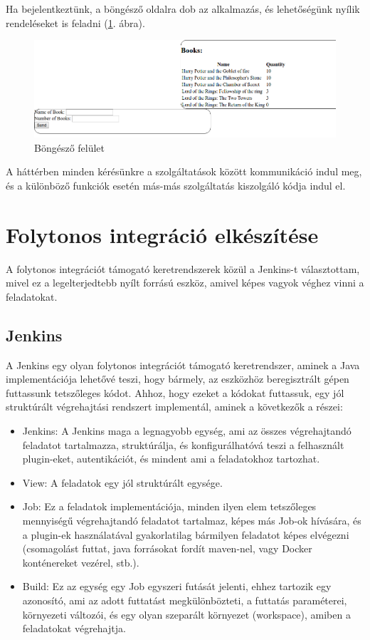 \documentclass[11pt,magyar,a4paper,twoside,]{report}
\providecommand{\tightlist}{%
  \setlength{\itemsep}{0pt}\setlength{\parskip}{0pt}}
\let\Oldincludegraphics\includegraphics
\renewcommand{\includegraphics}[1]{
\begin{adjustbox}{max size={\textwidth}{\textheight}}
    \Oldincludegraphics[scale=0.6]{#1}%
\end{adjustbox}
}
\begin{document}
Ha bejelentkeztünk, a böngésző oldalra dob az alkalmazás, és
lehetőségünk nyílik rendeléseket is feladni (\ref{browse}. ábra).

\begin{figure}[H]
\centering
\includegraphics{img/browsescreen.png}
\caption{Böngésző felület\label{browse}}
\end{figure}

A háttérben minden kérésünkre a szolgáltatások között kommunikáció indul
meg, és a különböző funkciók esetén más-más szolgáltatás kiszolgáló
kódja indul el.

\section{Folytonos integráció
elkészítése}\label{folytonos-integruxe1ciuxf3-elkuxe9szuxedtuxe9se}

A folytonos integrációt támogató keretrendszerek közül a Jenkins-t
választottam, mivel ez a legelterjedtebb nyílt forrású eszköz, amivel
képes vagyok véghez vinni a feladatokat.

\subsection{Jenkins}\label{jenkins}

A Jenkins egy olyan folytonos integrációt támogató keretrendszer, aminek
a Java implementációja lehetővé teszi, hogy bármely, az eszközhöz
beregisztrált gépen futtassunk tetszőleges kódot. Ahhoz, hogy ezeket a
kódokat futtassuk, egy jól struktúrált végrehajtási rendszert
implementál, aminek a következők a részei:

\begin{itemize}
\tightlist
\item
  Jenkins: A Jenkins maga a legnagyobb egység, ami az összes
  végrehajtandó feladatot tartalmazza, struktúrálja, és konfigurálhatóvá
  teszi a felhasznált plugin-eket, autentikációt, és mindent ami a
  feladatokhoz tartozhat.
\item
  View: A feladatok egy jól struktúrált egysége.
\item
  Job: Ez a feladatok implementációja, minden ilyen elem tetszőleges
  mennyiségű végrehajtandó feladatot tartalmaz, képes más Job-ok
  hívására, és a plugin-ek használatával gyakorlatilag bármilyen
  feladatot képes elvégezni (csomagolást futtat, java forrásokat fordít
  maven-nel, vagy Docker konténereket vezérel, stb.).
\item
  Build: Ez az egység egy Job egyszeri futását jelenti, ehhez tartozik
  egy azonosító, ami az adott futtatást megkülönbözteti, a futtatás
  paraméterei, környezeti változói, és egy olyan szeparált környezet
  (workspace), amiben a feladatokat végrehajtja.
\end{itemize}
\end{document}
